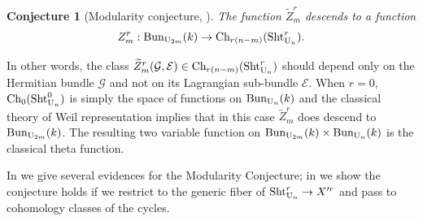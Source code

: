 \documentclass[11pt]{amsart}
\numberwithin{equation}{section}
\theoremstyle{plain}
\newtheorem{conj}[subsubsection]{Conjecture}
\theoremstyle{definition}
\newcommand\cE{\mathcal{E}}
\newcommand\cG{\mathcal{G}}
\newcommand{\Bun}{\textup{Bun}}
\newcommand{\Ch}{\textup{Ch}}
\newcommand\Sht{\textup{Sht}}
\newcommand\Ug{\textup{U}}
\newcommand{\wt}[1]{\widetilde{#1}}
\begin{document}
\begin{conj}[Modularity conjecture, {\cite[Conjecture 4.12]{FYZ2}}]The function $\wt Z^{r}_{m}$ descends to a function
\begin{equation*}
Z^{r}_{m}:\Bun_{\Ug_{2m}}(k)\to \Ch_{r(n-m)}(\Sht^{r}_{\Ug_{n}}).
\end{equation*}
\end{conj}
In other words, the  class $\wt Z^{r}_{m}(\cG,\cE)\in \Ch_{r(n-m)}(\Sht^{r}_{\Ug_{n}})$ should depend only on the Hermitian bundle $\cG$ and not on its Lagrangian sub-bundle $\cE$. When $r=0$, $\Ch_{0}(\Sht^{0}_{\Ug_{n}})$ is simply the space of functions on $\Bun_{\Ug_{n}}(k)$ and the classical theory of Weil representation implies that in this case $\wt Z^{r}_{m}$ does descend to $\Bun_{\Ug_{2m}}(k)$. The resulting two variable function on $\Bun_{\Ug_{2m}}(k)\times \Bun_{\Ug_{n}}(k)$ is the classical theta function.

In \cite{FYZ2} we give several evidences for the Modularity Conjecture; in \cite{FYZ3} we show the conjecture holds if we restrict to the generic fiber of $\Sht^{r}_{\Ug_{n}}\to X'^{r}$ and pass to cohomology classes of the cycles.
\end{document}
